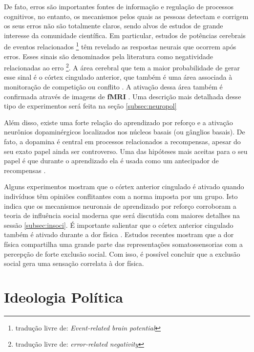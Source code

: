 De fato, erros são importantes fontes de informação e regulação de
processos cognitivos, no entanto, os mecanismos pelos quais as pessoas
detectam e corrigem os seus erros não são totalmente claros, sendo alvos 
de estudos de grande interesse da comunidade científica\cite{Yeung2004}.
Em particular, estudos de potências cerebrais de eventos relacionados
\footnote{ tradução livre de: \textit{Event-related brain potential} }
têm revelado as respostas neurais que ocorrem após erros. Esses sinais são
denominados pela literatura como negatividade relacionadas ao erro \footnote{
tradução livre de: \textit{error-related negativity} }. A área cerebral que
tem a maior probabilidade de gerar esse sinal é o córtex cingulado anterior,
que também é uma área associada à monitoração de competição ou conflito
\citep{Yeung2004}. A ativação dessa área também é confirmada através
de imagens de \textbf{fMRI} \citep{Yeung2004}. Uma descrição mais detalhada
desse tipo de experimentos será feita na seção \ref{subsec:neuropol}

Além disso, existe uma forte relação do aprendizado por reforço e a
ativação neurônios dopaminérgicos localizados nos núcleos basais (ou
gânglios basais)\citep{Holroyd2002,Redgrave2006b}. De fato, a dopamina é
central em processos relacionados a recompensas, apesar do seu exato papel
ainda ser controverso. Uma das hipóteses mais aceitas para o seu papel é
que durante o aprendizado ela é usada como um antecipador de recompensas
\citep{Flagel2011}.

Alguns experimentos \citep{Klucharev2009,Campbell-Meiklejohn2010} mostram
que o córtex anterior cingulado é ativado quando indivíduos têm
opiniões conflitantes com a norma imposta por um grupo.  Isto indica
que os mecanismos neuronais de aprendizado por reforço corroboram a
teoria de influência social moderna que será discutida com maiores
detalhes na sessão \ref{subsec:insoci}.  É importante salientar que
o córtex anterior cingulado também é ativado durante a dor física
\citep{Somerville2006,Eisenberger2003}. Estudos recentes mostram que a dor
física compartilha uma grande parte das representações somatossensorias
com a percepção de forte exclusão social\citep{Kross2011}. Com isso,
é possível concluir que a exclusão social gera uma sensação correlata
à dor física.

\section{Ideologia Política} %

